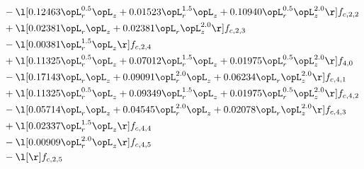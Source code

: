 \begin{alignat}{2}
& - \l[  0.12463 \opL_r^{0.5} \opL_z +  0.01523 \opL_r^{1.5} \opL_z +  0.10940 \opL_r^{0.5} \opL_z^{2.0}  \r] f_{c,2,2} \nonumber \\ 
& + \l[  0.02381 \opL_r \opL_z +  0.02381 \opL_r \opL_z^{2.0}  \r] f_{c,2,3} \nonumber \\ 
& - \l[  0.00381 \opL_r^{1.5} \opL_z  \r] f_{c,2,4} \nonumber \\ 
& + \l[  0.11325 \opL_r^{0.5} \opL_z +  0.07012 \opL_r^{1.5} \opL_z +  0.01975 \opL_r^{0.5} \opL_z^{2.0}  \r] f_{4,0} \nonumber \\ 
& - \l[  0.17143 \opL_r \opL_z +  0.09091 \opL_r^{2.0} \opL_z +  0.06234 \opL_r \opL_z^{2.0}  \r] f_{c,4,1} \nonumber \\ 
& + \l[  0.11325 \opL_r^{0.5} \opL_z +  0.09349 \opL_r^{1.5} \opL_z +  0.01975 \opL_r^{0.5} \opL_z^{2.0}  \r] f_{c,4,2} \nonumber \\ 
& - \l[  0.05714 \opL_r \opL_z +  0.04545 \opL_r^{2.0} \opL_z +  0.02078 \opL_r \opL_z^{2.0}  \r] f_{c,4,3} \nonumber \\ 
& + \l[  0.02337 \opL_r^{1.5} \opL_z  \r] f_{c,4,4} \nonumber \\ 
& - \l[  0.00909 \opL_r^{2.0} \opL_z  \r] f_{c,4,5} \nonumber \\ 
& - \l[  \r] f_{c,2,5} \nonumber \\ 
\end{alignat} 


